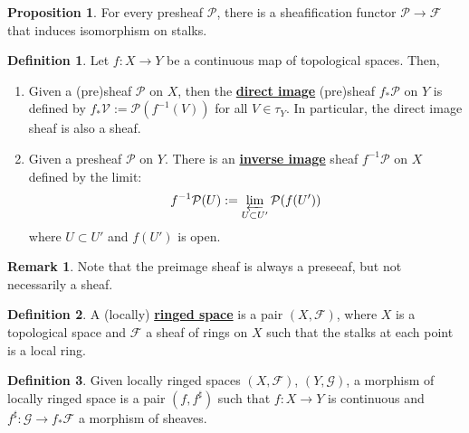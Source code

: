\documentclass{article}
\theoremstyle{definition}
\theoremstyle{definition}
\newtheorem{definition}{Definition}[theorem]
\theoremstyle{definition}
\newtheorem{remark}{Remark}[theorem]
\theoremstyle{definition}
\newtheorem{proposition}{Proposition}[theorem]
\theoremstyle{definition}
\theoremstyle{definition}
\theoremstyle{definition}
\begin{document}
\begin{tcolorbox}[colback=blue!5!white,colframe=blue!30!white]
\begin{proposition}
For every presheaf $\mathcal{P}$, there is a sheafification functor $\mathcal{P}\to \mathcal{F}$ that induces isomorphism on stalks. 
\end{proposition}
\end{tcolorbox}


\begin{tcolorbox}[colback=purple!5!white,colframe=purple!75!black]
\begin{definition}
Let $f:X\to Y$ be a continuous map of topological spaces. Then, 
\begin{enumerate}
    \item Given a (pre)sheaf $\mathcal{P}$ on $X$, then the \underline{\textbf{direct image}} (pre)sheaf $f_*\mathcal{P}$ on $Y$ is defined by $f_*\mathcal{V}:=\mathcal{P}(f^{-1}(V))$ for all $V\in \tau_Y$. In particular, the direct image sheaf is also a sheaf.
    \item Given a presheaf $\mathcal{P}$ on $Y$. There is an \underline{\textbf{inverse image}} sheaf $f^{-1}\mathcal{P}$ on $X$ defined by the limit:
    \[f^{-1}\mathcal{P}(U):=\varprojlim_{U\subset U'} \mathcal{P}(f(U')) \]
    where $U\subset U'$ and $f(U')$ is open. 
\end{enumerate}
\end{definition}
\end{tcolorbox}

\begin{tcolorbox}[colback=green!5!white,colframe=green!30!white]
\begin{remark}
Note that the preimage sheaf is always a preseeaf, but not necessarily a sheaf. 
\end{remark}
\end{tcolorbox}


\begin{tcolorbox}[colback=purple!5!white,colframe=purple!75!black]
\begin{definition}
A (locally) \underline{\textbf{ringed space}} is a pair $(X,\mathcal{F})$, where $X$ is a topological space and $\mathcal{F}$ a sheaf of rings on $X$ such that the stalks at each point is a local ring. 
\end{definition} 
\end{tcolorbox}


\begin{tcolorbox}[colback=purple!5!white,colframe=purple!75!black]
\begin{definition}
Given locally ringed spaces $(X,\mathcal{F})$, $(Y,\mathcal{G})$, a morphism of locally ringed space is a pair $(f,f^{\sharp})$ such that $f: X\to Y$ is continuous and $f^{\sharp}: \mathcal{G}\to f_*\mathcal{F}$ a morphism of sheaves. 
\end{definition}
\end{tcolorbox}
\end{document}
